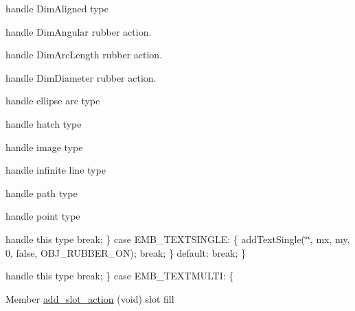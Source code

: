 \begin{DoxyRefList}
handle Dim\+Aligned type 



handle Dim\+Angular rubber action. 



handle Dim\+Arc\+Length rubber action. 



handle Dim\+Diameter rubber action. 



handle ellipse arc type 



handle hatch type 



handle image type 



handle infinite line type 



handle path type 



handle point type

\label{todo__todo000140}%
%
handle this type break; \} case EMB\+\_\+\+TEXTSINGLE\+: \{ add\+Text\+Single(\char`\"{}\char`\"{}, mx, my, 0, false, OBJ\+\_\+\+RUBBER\+\_\+\+ON); break; \} default\+: break; \}

\label{todo__todo000139}%
%


\label{todo__todo000138}%
%
handle this type break; \} case EMB\+\_\+\+TEXTMULTI\+: \{ 

\label{todo__todo000137}%
%
 
\item[Member \mbox{\hyperlink{imgui__main_8c_a565adddcd5c9478eaa23682f2d63d55c}{add\+\_\+slot\+\_\+action}} (void)]\label{todo__todo000149}%
%
slot fill 


\end{DoxyRefList}

